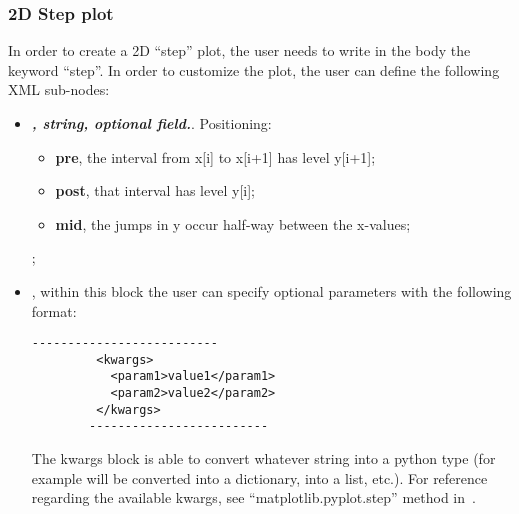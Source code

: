 \subsubsection{2D Step plot}
In order to create a 2D ``step'' plot, the user needs to write in the 
body the keyword ``step''.
%
In order to customize the plot, the user can define the following XML sub-nodes:
  \begin{itemize}
  \item {}\textbf{\textit{, string, optional field.}}.
  Positioning:
     \begin{itemize}
    \item \textbf{pre}, the interval from x[i] to x[i+1] has level y[i+1];
    \item \textbf{post}, that interval has level y[i];
    \item \textbf{mid}, the jumps in y occur half-way between the x-values;
     \end{itemize}
  ;
  \item \textit{}, within this block the user can specify optional
  parameters with the following format:
        \begin{lstlisting}[style=XML]
        --------------------------
         <kwargs>
           <param1>value1</param1>
           <param2>value2</param2>
         </kwargs>
        -------------------------
       \end{lstlisting}
  The kwargs block is able to convert whatever string into a python type (for
  example  will be converted into a
  dictionary,  into a list, etc.).
  For reference regarding the available kwargs, see ``matplotlib.pyplot.step''
  method in~\cite{MatPlotLib}.
    \end{itemize}

